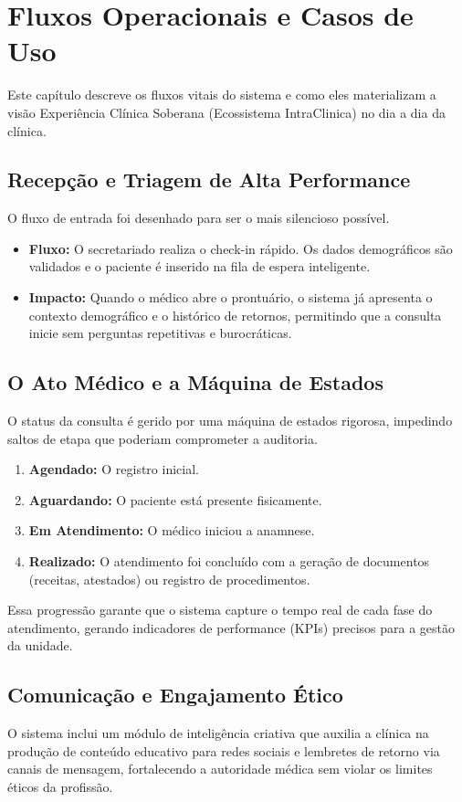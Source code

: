 \chapter{Fluxos Operacionais e Casos de Uso}

Este capítulo descreve os fluxos vitais do sistema e como eles materializam a visão Experiência Clínica Soberana (Ecossistema IntraClinica) no dia a dia da clínica.

\section{Recepção e Triagem de Alta Performance}

O fluxo de entrada foi desenhado para ser o mais silencioso possível.
\begin{itemize}
    \item \textbf{Fluxo:} O secretariado realiza o check-in rápido. Os dados demográficos são validados e o paciente é inserido na fila de espera inteligente.
    \item \textbf{Impacto:} Quando o médico abre o prontuário, o sistema já apresenta o contexto demográfico e o histórico de retornos, permitindo que a consulta inicie sem perguntas repetitivas e burocráticas.
\end{itemize}

\section{O Ato Médico e a Máquina de Estados}

O status da consulta é gerido por uma máquina de estados rigorosa, impedindo saltos de etapa que poderiam comprometer a auditoria.
\begin{enumerate}
    \item \textbf{Agendado:} O registro inicial.
    \item \textbf{Aguardando:} O paciente está presente fisicamente.
    \item \textbf{Em Atendimento:} O médico iniciou a anamnese.
    \item \textbf{Realizado:} O atendimento foi concluído com a geração de documentos (receitas, atestados) ou registro de procedimentos.
\end{enumerate}

Essa progressão garante que o sistema capture o tempo real de cada fase do atendimento, gerando indicadores de performance (KPIs) precisos para a gestão da unidade.

\section{Comunicação e Engajamento Ético}

O sistema inclui um módulo de inteligência criativa que auxilia a clínica na produção de conteúdo educativo para redes sociais e lembretes de retorno via canais de mensagem, fortalecendo a autoridade médica sem violar os limites éticos da profissão.
